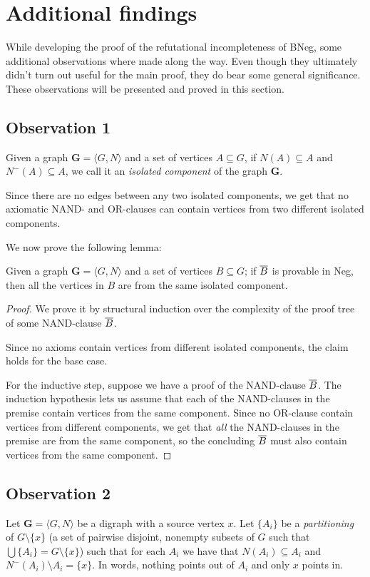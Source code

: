 \section{Additional findings}
\label{sec:Additional findings}
While developing the proof of the refutational incompleteness of BNeg, some additional observations where made along the way.
Even though they ultimately didn't turn out useful for the main proof, they do bear some general significance.
These observations will be presented and proved in this section.

\subsection{Observation 1}
\label{sub:Observation 1}
Given a graph $\mathbf{G} = \langle G,N \rangle$ and a set of vertices $A \subseteq G$, if $N(A) \subseteq A$ and $N^-(A) \subseteq A$, we call it an \textit{isolated component} of the graph $\mathbf{G}$.

Since there are no edges between any two isolated components, we get that no axiomatic NAND- and OR-clauses can contain vertices from two different isolated components.

We now prove the following lemma:
\begin{lemma}
  Given a graph $\mathbf{G} = \langle G,N \rangle$ and a set of vertices $B \subseteq G$; if $\ol{B}$ is provable in Neg, then all the vertices in $B$ are from the same isolated component.
  \label{thm:same_component_provable}
\end{lemma}
\begin{proof}
  We prove it by structural induction over the complexity of the proof tree of some NAND-clause $\ol{B}$.

  Since no axioms contain vertices from different isolated components, the claim holds for the base case.

  For the inductive step, suppose we have a proof of the NAND-clause $\ol{B}$.
  The induction hypothesis lets us assume that each of the NAND-clauses in the premise contain vertices from the same component.
  Since no OR-clause contain vertices from different components, we get that \textit{all} the NAND-clauses in the premise are from the same component, so the concluding $\ol{B}$ must also contain vertices from the same component.
\end{proof}
\subsection{Observation 2}
\label{sub:Observation 2}
Let $\mathbf{G} = \langle G,N \rangle$ be a digraph with a source vertex $x$.
Let $\{A_i\}$ be a \textit{partitioning} of $G \setminus \{ x \}$ (a set of pairwise disjoint, nonempty subsets of $G$ such that $\bigcup \{A_i\} = G \setminus \{ x \}$) such that for each $A_i$ we have that $N(A_i) \subseteq A_i$ and $N^-(A_i) \setminus A_i = \{ x \}$.
In words, nothing points out of $A_i$ and only $x$ points in.

